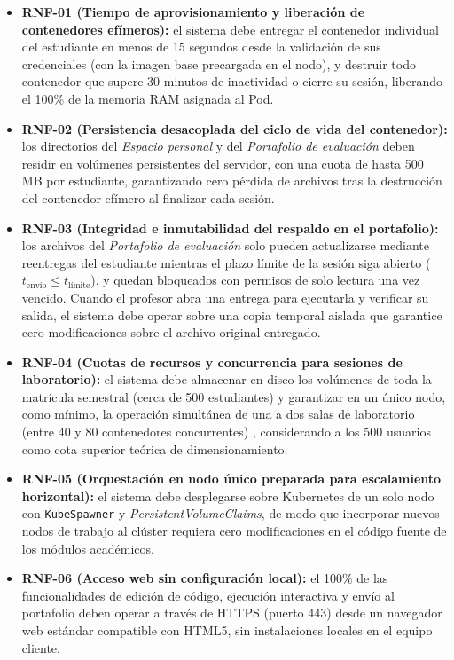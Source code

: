 \begin{itemize}
    \item \textbf{RNF-01 (Tiempo de aprovisionamiento y liberación de contenedores efímeros):} el sistema debe entregar el contenedor individual del estudiante en menos de 15 segundos desde la validación de sus credenciales (con la imagen base precargada en el nodo), y destruir todo contenedor que supere 30 minutos de inactividad o cierre su sesión, liberando el 100\% de la memoria RAM asignada al Pod.
    \item \textbf{RNF-02 (Persistencia desacoplada del ciclo de vida del contenedor):} los directorios del \textit{Espacio personal} y del \textit{Portafolio de evaluación} deben residir en volúmenes persistentes del servidor, con una cuota de hasta 500 MB por estudiante, garantizando cero pérdida de archivos tras la destrucción del contenedor efímero al finalizar cada sesión.
    \item \textbf{RNF-03 (Integridad e inmutabilidad del respaldo en el portafolio):} los archivos del \textit{Portafolio de evaluación} solo pueden actualizarse mediante reentregas del estudiante mientras el plazo límite de la sesión siga abierto ($t_{\text{envío}} \le t_{\text{límite}}$), y quedan bloqueados con permisos de solo lectura una vez vencido. Cuando el profesor abra una entrega para ejecutarla y verificar su salida, el sistema debe operar sobre una copia temporal aislada que garantice cero modificaciones sobre el archivo original entregado.
    \item \textbf{RNF-04 (Cuotas de recursos y concurrencia para sesiones de laboratorio):} el sistema debe almacenar en disco los volúmenes de toda la matrícula semestral (cerca de 500 estudiantes) y garantizar en un único nodo, como mínimo, la operación simultánea de una a dos salas de laboratorio (entre 40 y 80 contenedores concurrentes) \cite{uv_infraestructura}, considerando a los 500 usuarios como cota superior teórica de dimensionamiento.
    \item \textbf{RNF-05 (Orquestación en nodo único preparada para escalamiento horizontal):} el sistema debe desplegarse sobre Kubernetes de un solo nodo con \texttt{KubeSpawner} y \textit{PersistentVolumeClaims}, de modo que incorporar nuevos nodos de trabajo al clúster requiera cero modificaciones en el código fuente de los módulos académicos.
    \item \textbf{RNF-06 (Acceso web sin configuración local):} el 100\% de las funcionalidades de edición de código, ejecución interactiva y envío al portafolio deben operar a través de HTTPS (puerto 443) desde un navegador web estándar compatible con HTML5, sin instalaciones locales en el equipo cliente.

\end{itemize}
